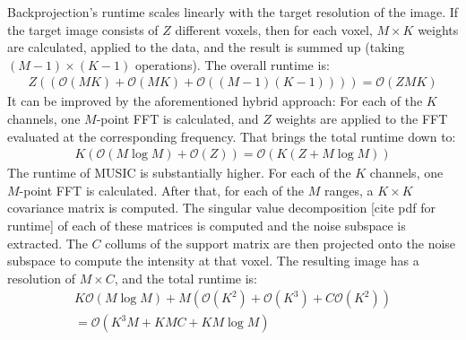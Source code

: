 Backprojection's runtime scales linearly with the target resolution of the image.
If the target image consists of $Z$ different voxels,
then for each voxel, $M\times K$ weights are calculated, applied to the data, and the result is summed up (taking $(M-1) \times (K-1)$ operations).
The overall runtime is:
\begin{align}
    Z \left(\left(\mathcal O(MK) + \mathcal O(MK) + \mathcal O((M-1)(K-1))\right)\right) = \mathcal O(ZMK)
\end{align}
It can be improved by the aforementioned hybrid approach:
For each of the $K$ channels, one $M$-point FFT is calculated,
and $Z$ weights are applied to the FFT evaluated at the corresponding frequency.
That brings the total runtime down to:
\begin{align}
    K \left( \mathcal O(M \log M) + \mathcal O(Z)\right) = \mathcal O \left(K(Z + M\log M) \right)
\end{align}
The runtime of MUSIC is substantially higher.
For each of the $K$ channels, one $M$-point FFT is calculated.
After that, for each of the $M$ ranges, a $K\times K$ covariance matrix is computed.
The singular value decomposition [cite pdf for runtime] of each of these matrices is computed and the noise subspace is extracted.
The $C$ collums of the support matrix are then projected onto the noise subspace to compute the intensity at that voxel.
The resulting image has a resolution of $M\times C$, and the total runtime is:
\begin{align}
    K \mathcal O ( M \log M) + M ( \mathcal O (K^2) + \mathcal O (K^3) + C \mathcal O(K^2)) \\
    = \mathcal O \left(K^3M +KMC+KM\log M\right)
\end{align}